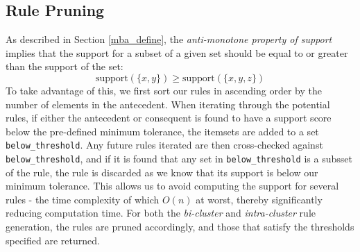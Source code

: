 \subsection{Rule Pruning}
As described in Section \ref{mba_define}, the \textit{anti-monotone property of support} implies that the support for a subset of a given set should be equal to or greater than the support of the set: \[\text{support}(\{x,y\}) \geq \text{support}(\{x,y,z\})\]
To take advantage of this, we first sort our rules in ascending order by the number of elements in the antecedent. When iterating through the potential rules, if either the antecedent or consequent is found to have a support score below the pre-defined minimum tolerance, the itemsets are added to a set \texttt{below\_threshold}. Any future rules iterated are then cross-checked against \texttt{below\_threshold}, 
and if it is found that any set in \texttt{below\_threshold} is a subsset of the rule, the rule is discarded as we know that its support is below our minimum tolerance. This allows us to avoid computing the support for several rules - the time complexity of which $O(n)$ at worst, thereby significantly reducing computation time. For both the \textit{bi-cluster} and \textit{intra-cluster} rule generation, the rules are pruned accordingly, and those that satisfy the thresholds specified are returned.
